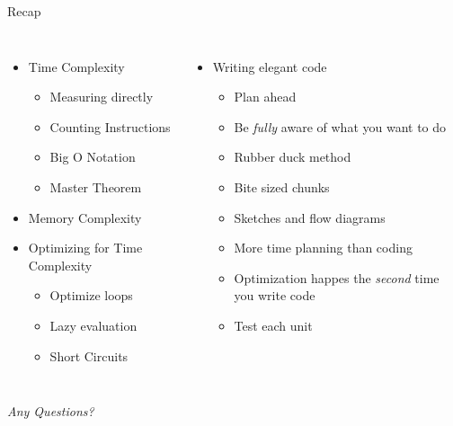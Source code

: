 
\begin{frame}[t,plain]
\titlepage
\end{frame}


\begin{frame}{Recap}
%
\begin{columns}[T]
\begin{itemize}
\item Time Complexity
	\begin{itemize}
	\item Measuring directly
	\item Counting Instructions
	\item Big O Notation
	\item Master Theorem
	\end{itemize}
\item Memory Complexity
\item Optimizing for Time Complexity
	\begin{itemize}
	\item Optimize loops
	\item Lazy evaluation
	\item Short Circuits
	\end{itemize}
\end{itemize}
%
\begin{itemize}
\item Writing elegant code
	\begin{itemize}
	\item Plan ahead
	\item Be \emph{fully} aware of what you want to do
	\item Rubber duck method
	\item Bite sized chunks
	\item Sketches and flow diagrams
	\item More time planning than coding
	\item Optimization happes the \emph{second} time you write code
	\item Test each unit
	\end{itemize}
\end{itemize}

\end{columns}
%
\begin{center}
	\emph{Any Questions?}
\end{center}
%
\end{frame}

